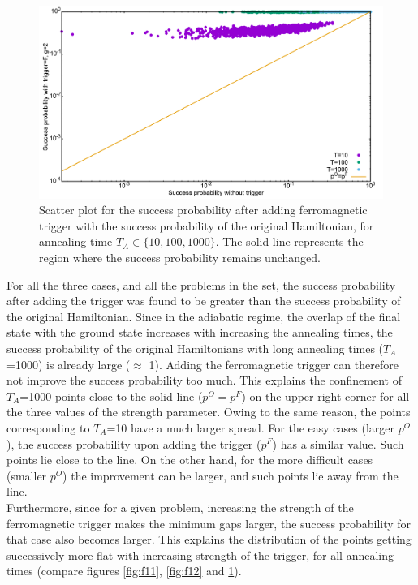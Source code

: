 \documentclass[../main.tex]{subfiles}
\begin{document}
\begin{figure}[H]
\centering
\includegraphics[scale=0.3]{Scatt_s12_F_g2.png}
\caption{Scatter plot for the success probability after adding ferromagnetic trigger with the success probability of the original Hamiltonian, for annealing time $T_A \in \{10,100,1000\}$. The solid line represents the region where the success probability remains unchanged.}
\label{fig:f13}
\end{figure}

For all the three cases, and all the problems in the set, the success probability after adding the trigger was found to be greater than the success probability of the original Hamiltonian. Since in the adiabatic regime, the overlap of the final state with the ground state increases with increasing the annealing times, the success probability of the original Hamiltonians with long annealing times ($T_A$=1000) is already large ($\approx$ 1). Adding the ferromagnetic trigger can therefore not improve the success probability too much. This explains the confinement of $T_A$=1000 points close to the solid line ($p^O=p^F$) on the upper right corner for all the three values of the strength parameter. Owing to the same reason, the points corresponding to $T_A$=10 have a much larger spread. For the easy cases (larger $p^O$), the success probability upon adding the trigger ($p^F$) has a similar value. Such points lie close to the line. On the other hand, for the more difficult cases (smaller $p^O$) the improvement can be larger, and such points lie away from the line.\\

Furthermore, since for a given problem, increasing the strength of the ferromagnetic trigger makes the minimum gaps larger, the success probability for that case also becomes larger. This explains the distribution of the points getting successively more flat with increasing strength of the trigger, for all annealing times (compare figures \ref{fig:f11}, \ref{fig:f12} and \ref{fig:f13}).\\
\end{document}
